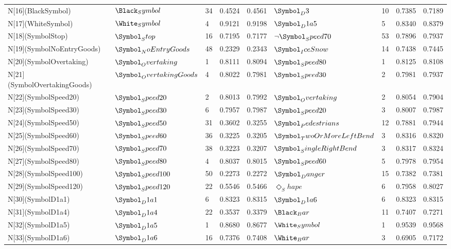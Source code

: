 \begin{tabular}{lllllllll}
N[16](BlackSymbol) & $\Black_Symbol$ & 34 & 0.4524 & 0.4561 & $\Symbol_D3$ & 10 & 0.7385 & 0.7189 \\
N[17](WhiteSymbol) & $\White_Symbol$ & 4 & 0.9121 & 0.9198 & $\Symbol_D1a5$ & 5 & 0.8340 & 0.8379 \\
N[18](SymbolStop) & $\Symbol_Stop$ & 16 & 0.7195 & 0.7177 & $\neg \Symbol_Speed70$ & 53 & 0.7896 & 0.7937 \\
N[19](SymbolNoEntryGoods) & $\Symbol_NoEntryGoods$ & 48 & 0.2329 & 0.2343 & $\Symbol_IceSnow$ & 14 & 0.7438 & 0.7445 \\
N[20](SymbolOvertaking) & $\Symbol_Overtaking$ & 1 & 0.8111 & 0.8094 & $\Symbol_Speed80$ & 1 & 0.8125 & 0.8108 \\
N[21](SymbolOvertakingGoods) & $\Symbol_OvertakingGoods$ & 4 & 0.8022 & 0.7981 & $\Symbol_Speed30$ & 2 & 0.7981 & 0.7937 \\
N[22](SymbolSpeed20) & $\Symbol_Speed20$ & 2 & 0.8013 & 0.7992 & $\Symbol_Overtaking$ & 2 & 0.8054 & 0.7904 \\
N[23](SymbolSpeed30) & $\Symbol_Speed30$ & 6 & 0.7957 & 0.7987 & $\Symbol_Speed20$ & 3 & 0.8007 & 0.7987 \\
N[24](SymbolSpeed50) & $\Symbol_Speed50$ & 31 & 0.3602 & 0.3255 & $\Symbol_Pedestrians$ & 12 & 0.7881 & 0.7944 \\
N[25](SymbolSpeed60) & $\Symbol_Speed60$ & 36 & 0.3225 & 0.3205 & $\Symbol_TwoOrMoreLeftBend$ & 3 & 0.8316 & 0.8320 \\
N[26](SymbolSpeed70) & $\Symbol_Speed70$ & 38 & 0.3223 & 0.3207 & $\Symbol_SingleRightBend$ & 3 & 0.8317 & 0.8324 \\
N[27](SymbolSpeed80) & $\Symbol_Speed80$ & 4 & 0.8037 & 0.8015 & $\Symbol_Speed60$ & 5 & 0.7978 & 0.7954 \\
N[28](SymbolSpeed100) & $\Symbol_Speed100$ & 50 & 0.2273 & 0.2272 & $\Symbol_Danger$ & 15 & 0.7382 & 0.7381 \\
N[29](SymbolSpeed120) & $\Symbol_Speed120$ & 22 & 0.5546 & 0.5466 & $\Diamond_Shape$ & 6 & 0.7958 & 0.8027 \\
N[30](SymbolD1a1) & $\Symbol_D1a1$ & 6 & 0.8323 & 0.8315 & $\Symbol_D1a6$ & 6 & 0.8323 & 0.8315 \\
N[31](SymbolD1a4) & $\Symbol_D1a4$ & 22 & 0.3537 & 0.3379 & $\Black_Bar$ & 11 & 0.7407 & 0.7271 \\
N[32](SymbolD1a5) & $\Symbol_D1a5$ & 1 & 0.8680 & 0.8677 & $\White_Symbol$ & 1 & 0.9539 & 0.9568 \\
N[33](SymbolD1a6) & $\Symbol_D1a6$ & 16 & 0.7376 & 0.7408 & $\White_Bar$ & 3 & 0.6905 & 0.7172 \\

\end{tabular}
